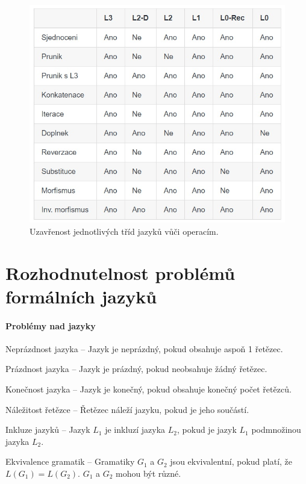 \begin{figure}[H]
    \centering
    \includegraphics[width=1\linewidth]{uzavrenost_jazyku.png}
    \caption{Uzavřenost jednotlivých tříd jazyků vůči operacím.}
\end{figure}



\section{Rozhodnutelnost problémů formálních jazyků}

\paragraph*{Problémy nad jazyky} \begin{compactitem}
    \item Neprázdnost jazyka -- Jazyk je neprázdný, pokud obsahuje aspoň 1 řetězec.

    \item Prázdnost jazyka -- Jazyk je prázdný, pokud neobsahuje žádný řetězec.

    \item Konečnost jazyka -- Jazyk je konečný, pokud obsahuje konečný počet řetězců.

    \item Náležitost řetězce -- Řetězec náleží jazyku, pokud je jeho součástí.

    \item Inkluze jazyků -- Jazyk $L_1$ je inkluzí jazyka $L_2$, pokud je jazyk $L_1$ podmnožinou jazyka $L_2$.

    \item Ekvivalence gramatik -- Gramatiky $G_1$ a $G_2$ jsou ekvivalentní, pokud platí, že\break $L(G_1) = L(G_2)$. $G_1$ a $G_2$ mohou být různé.
\end{compactitem}

